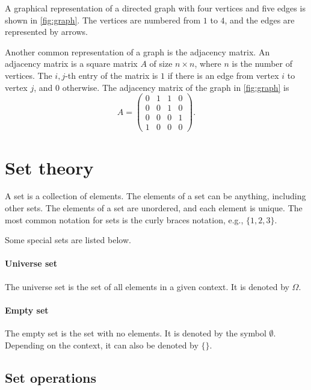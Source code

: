 A graphical representation of a directed graph with four vertices and five edges is shown
in \cref{fig:graph}.  The vertices are numbered from $1$ to $4$, and the edges are
represented by arrows.

Another common representation of a graph is the adjacency matrix.  An adjacency matrix is
a square matrix $A$ of size $n \times n$, where $n$ is the number of vertices.  The
$i, j$-th entry of the matrix is $1$ if there is an edge from vertex $i$ to vertex $j$,
and $0$ otherwise.  The adjacency matrix of the graph in \cref{fig:graph} is
\[
  A = \begin{pmatrix}
    0 & 1 & 1 & 0 \\
    0 & 0 & 1 & 0 \\
    0 & 0 & 0 & 1 \\
    1 & 0 & 0 & 0
  \end{pmatrix}\text{.}
\]


\section{Set theory}

A set is a collection of elements.  The elements of a set can be anything, including
other sets.  The elements of a set are unordered, and each element is unique.  The
most common notation for sets is the curly braces notation, e.g., $\{1, 2, 3\}$.

Some special sets are listed below.

\paragraph{Universe set}  The universe set is the set of all elements in a given context.
It is denoted by $\Omega$.

\paragraph{Empty set}  The empty set is the set with no elements.  It is denoted by
the symbol $\emptyset$.  Depending on the context, it can also be denoted by $\{\}$.

\subsection{Set operations}

